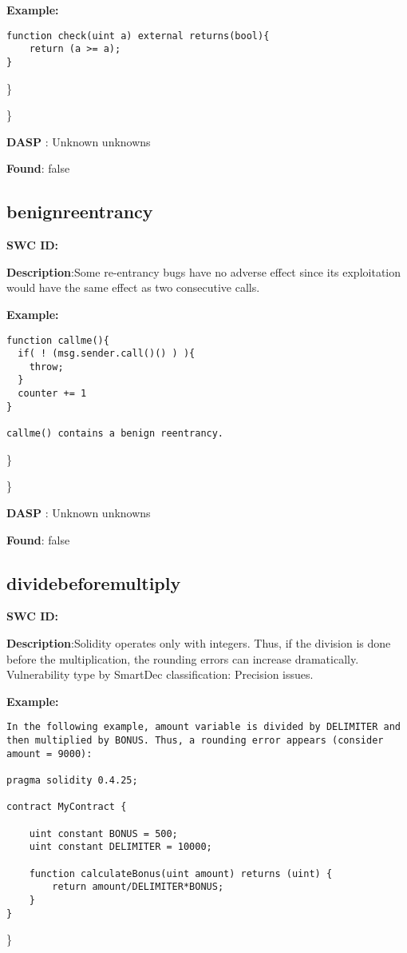 \documentclass{article}
\begin{document}
\textbf{Example:} 
\begin{verbatim}
function check(uint a) external returns(bool){
    return (a >= a);
}

\end{verbatim}\} 

\} 

\textbf{DASP} : Unknown unknowns

\textbf{Found}: false

\subsection{benign\textunderscore reentrancy} 
\textbf{SWC \textunderscore ID:} 

\textbf{Description}:Some re-entrancy bugs have no adverse effect since its exploitation would have the same effect as two consecutive calls.


\textbf{Example:} 
\begin{verbatim}
function callme(){
  if( ! (msg.sender.call()() ) ){
    throw;
  }
  counter += 1
}

callme() contains a benign reentrancy.

\end{verbatim}\} 

\} 

\textbf{DASP} : Unknown unknowns

\textbf{Found}: false

\subsection{divide\textunderscore before\textunderscore multiply} 
\textbf{SWC \textunderscore ID:} 

\textbf{Description}:Solidity operates only with integers. Thus, if the division is done before the multiplication, the rounding errors can increase dramatically. Vulnerability type by SmartDec classification: Precision issues.


\textbf{Example:} 
\begin{verbatim}
In the following example, amount variable is divided by DELIMITER and then multiplied by BONUS. Thus, a rounding error appears (consider amount = 9000):

pragma solidity 0.4.25;

contract MyContract {

    uint constant BONUS = 500;
    uint constant DELIMITER = 10000;

    function calculateBonus(uint amount) returns (uint) {
        return amount/DELIMITER*BONUS;
    }
}

\end{verbatim}\} 
\end{document}
